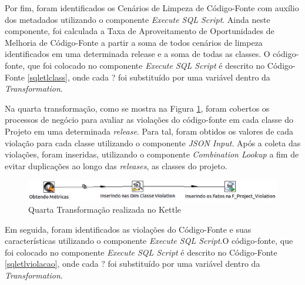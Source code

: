 \begin{apendicesenv}
Por fim, foram identificados os Cenários de Limpeza de Código-Fonte com auxílio dos metadados utilizando o componente \textit{Execute SQL Script}. Ainda neste componente, foi calculada a Taxa de Aproveitamento de Oportunidades de Melhoria de Código-Fonte a partir a soma de todos cenários de limpeza identificados em uma determinada release e a soma de todas as classes. O código-fonte, que foi colocado no componente \textit{Execute SQL Script} é descrito no Código-Fonte \ref{sqletlclass}, onde cada ? foi substituído por uma variável dentro da \textit{Transformation}.



Na quarta transformação, como se mostra na Figura \ref{fig:quartatransformation}, foram cobertos os processos de negócio para avaliar as violações do código-fonte em cada classe do Projeto em uma determinada \textit{release}. Para tal, foram obtidos os valores de cada violação para cada classe utilizando o componente \textit{JSON Input}. Após a coleta das violações, foram inseridas, utilizando o componente \textit{Combination Lookup} a fim de evitar duplicações ao longo das \textit{releases}, as classes do projeto.

\begin{figure}[h!]
\centering
\includegraphics[keepaspectratio=false,scale=0.45]{figuras/figuras_nilton/quartatransformation.eps}
\caption{Quarta Transformação realizada no Kettle}
\label{fig:quartatransformation}
\end{figure}
\FloatBarrier


Em seguida, foram identificados as violações do Código-Fonte e suas características utilizando o componente \textit{Execute SQL Script}.O código-fonte, que foi colocado no componente \textit{Execute SQL Script} é descrito no Código-Fonte \ref{sqletlviolacao}, onde cada ? foi substituído por uma variável dentro da \textit{Transformation}.





\end{apendicesenv}
